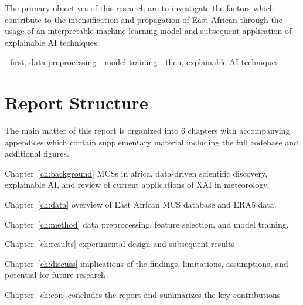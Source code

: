 The primary objectives of this research are to investigate the factors which contribute to the intensification and propagation of East African  through the usage of an interpretable machine learning model and subsequent application of explainable AI techniques. 

- first, data preprocessing
- model training
- then, explainable AI techniques

\section{Report Structure}

The main matter of this report is organized into 6 chapters with accompanying appendices which contain supplementary material including the full codebase and additional figures.

Chapter~\ref{ch:background} MCSs in africa, data-driven scientific discovery, explainable AI, and review of current applications of XAI in meteorology. 

Chapter~\ref{ch:data} overview of East African MCS database and ERA5 data. 

Chapter~\ref{ch:method} data preprocessing, feature selection, and model training. 

Chapter~\ref{ch:results}  experimental design and subsequent results

Chapter~\ref{ch:discuss} implications of the findings, limitations, assumptions, and potential for future research

Chapter~\ref{ch:con} concludes the report and summarizes the key contributions


